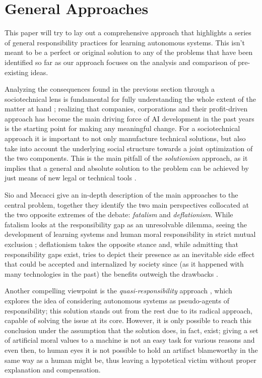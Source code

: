 \section{General Approaches}\label{sec:approaches}

This paper will try to lay out a comprehensive approach that highlights a series of general responsibility practices for learning autonomous systems.
This isn't meant to be a perfect or original solution to any of the problems that have been identified so far as our approach focuses on the analysis and comparison of pre-existing ideas.

Analyzing the consequences found in the previous section through a sociotechnical lens is fundamental for fully un\-der\-stand\-ing the whole extent of the matter at hand \parencite{THETE, NOVAIA}; realizing that companies, corporations and their profit-driven approach has become the main driving force of AI development in the past years is the starting point for making any meaningful change.
For a sociotechnical approach it is important to not only manufacture technical solutions, but also take into account the underlying social structure towards a joint optimization of the two components.
This is the main pitfall of the \textit{solutionism} approach, as it implies that a general and absolute solution to the problem can be achieved by just means of new legal or technical tools \parencite{MORTSE, STILML, SANFRG}.

Sio and Mecacci give an in-depth description of the main approaches to the central problem, together they identify the two main perspectives collocated at the two opposite extremes of the debate: \textit{fatalism} and \textit{deflationism}.
While fatalism looks at the responsibility gap as an unresolvable dilemma, seeing the development of learning systems and human moral responsibility in strict mutual exclusion \parencite{MATTRG}; deflationism takes the opposite stance and, while admitting that responsibility gaps exist, tries to depict their presence as an inevitable side effect that could be accepted and internalized by society since (as it happened with many technologies in the past) the benefits outweigh the drawbacks \parencite{HAYTMP, SIJWA}.

Another compelling viewpoint is the \textit{quasi-responsibility} approach \parencite{STARCA}, which explores the idea of considering autonomous systems as pseudo-agents of responsibility; this solution stands out from the rest due to its radical approach, capable of solving the issue at its core.
However, it is only possible to reach this conclusion under the assumption that the solution does, in fact, exist; giving a set of artificial moral values to a machine is not an easy task for various reasons and even then, to human eyes it is not possible to hold an artifact blameworthy in the same way as a human might be, thus leaving a hypotetical victim without proper explanation and compensation.